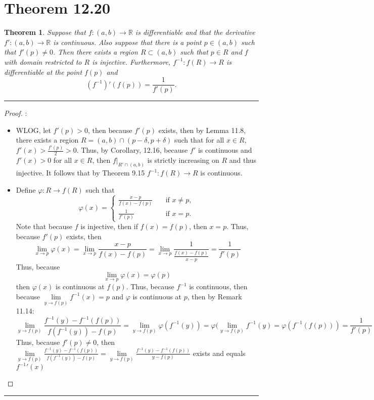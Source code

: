 \documentclass[openany, amssymb, psamsfonts]{amsart}
\newcommand{\bbR}{\mathbb{R}}
\renewcommand{\phi}{\varphi}
\newtheorem{thm}{Theorem}[section]
\theoremstyle{definition}
\numberwithin{equation}{section}
\begin{document}
\section*{Theorem 12.20}
\begin{thm}\label{12.20}
Suppose that $f:(a,b)\to\bbR$ is differentiable and that the derivative $f':(a,b)\to\bbR$ is continuous. Also suppose that there is a point $p\in(a,b)$ such that $f'(p)\neq 0$. 
Then there exists a region $R\subset (a,b)$ such that $p\in R$ and $f$ with domain restricted to $R$ is injective. 
Furthermore, $f^{-1}:f(R)\to R$ is differentiable at the point $f(p)$ and
$$ (f^{-1})'(f(p))=\frac{1}{f'(p)} .$$
\end{thm} 
\vspace{4pt}     \hrule   \vspace{4pt} \begin{proof}:\\
\begin{itemize}
    \item WLOG, let $f'(p)>0$, then because $f'(p)$ exists, then by Lemma 11.8, there exists a region $R = (a,b) \cap (p-\delta, p+\delta)$ such that for all $x\in R$, $f'(x) > \frac{f'(p)}{2} >0$. Thus, by Corollary, 12.16, because $f'$ is continuous and $f'(x)>0$ for all $x\in R$, then $f|_{R'\cap (a,b)}$ is strictly increasing on $R$ and thus injective. It follows that by Theorem 9.15 $f^{-1}: f(R) \to R$ is continuous.
    \item Define $\varphi: R \to f(R)$ such that \[
		\phi(x) =
		\begin{cases}
			\frac{x-p}{f(x) - f(p)} \quad &\text{if $x\neq p$, } \\
			\frac{1}{f'(p)} \quad &\text{if $x = p$.} 
		\end{cases}
	\]
 Note that because $f$ is injective, then if $f(x) = f(p)$, then $x = p$. 
    Thus, because $f'(p)$ exists, then \[\lim\limits_{x\to p}\varphi(x) = \lim\limits_{x\to p}\frac{x-p}{f(x) - f(p)} = \lim\limits_{x\to p}\frac{1}{\frac{f(x) - f(p)}{x - p}} = \frac{1}{f'(p)}\] Thus, because \[\lim\limits_{x\to p}\varphi(x) = \varphi(p)\] then $\varphi(x)$ is continuous at $f(p)$. Thus, because $f^{-1}$ is continuous, then because $\lim\limits_{y\to f(p)} f^{-1}(x) = p$ and $\varphi$ is continuous at $p$, then by Remark 11.14:
	\[\lim\limits_{y\to f(p)} \frac{f^{-1}(y) - f^{-1}(f(p))}{f(f^{-1}(y)) - f(p)} = \lim\limits_{y\to f(p)}\varphi(f^{-1}(y)) = \varphi(\lim\limits_{y\to f(p)}f^{-1}(y) = \varphi(f^{-1}(f(p))) = \frac{1}{f'(p)}\] 
Thus, because $f'(p) \neq 0$, then $\lim\limits_{y\to f(p)} \frac{f^{-1}(y) - f^{-1}(f(p))}{f(f^{-1}(y)) - f(p)} =\lim\limits_{y\to f(p)} \frac{f^{-1}(y) - f^{-1}(f(p))}{y
- f(p)}$ exists and equals $f^{-1}'(x)$
\end{itemize}
\end{proof}\vspace{4pt}     \hrule   \vspace{4pt}
\end{document}
